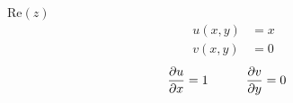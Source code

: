 \item[5.] Re$(z)$
\begin{align*}
    u(x,y) &= x\\
    v(x,y) &= 0
\end{align*}
\begin{align*}
    \frac{\partial u}{\partial x}  &= 1  &\qquad \frac{\partial v}{\partial y}  &= 0
\end{align*}
